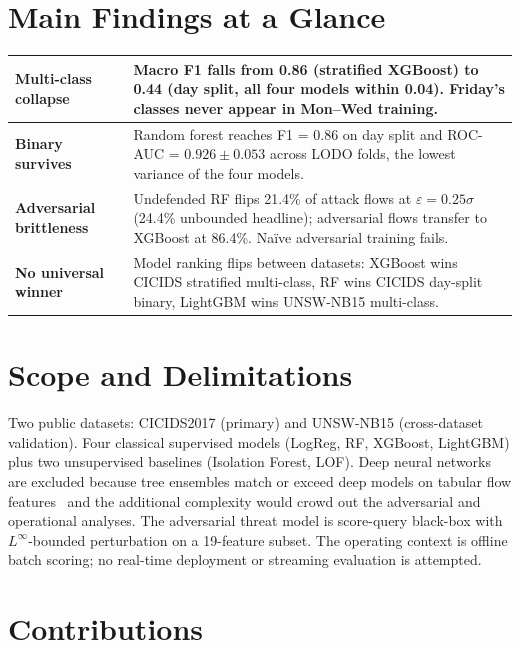 \section{Main Findings at a Glance}
\label{sec:findings-dashboard}

\begin{table}[H]
    \centering
    \footnotesize
    \renewcommand{\arraystretch}{1.4}
    \begin{tabular}{|p{3.5cm}|p{10.5cm}|}
        \hline
        \textbf{Multi-class collapse} & Macro F1 falls from 0.86 (stratified XGBoost) to 0.44 (day split, all four models within 0.04). Friday's classes never appear in Mon--Wed training. \\
        \hline
        \textbf{Binary survives} & Random forest reaches F1 = 0.86 on day split and ROC-AUC = $0.926 \pm 0.053$ across LODO folds, the lowest variance of the four models. \\
        \hline
        \textbf{Adversarial brittleness} & Undefended RF flips 21.4\% of attack flows at $\varepsilon = 0.25\sigma$ (24.4\% unbounded headline); adversarial flows transfer to XGBoost at 86.4\%. Naïve adversarial training fails. \\
        \hline
        \textbf{No universal winner} & Model ranking flips between datasets: XGBoost wins CICIDS stratified multi-class, RF wins CICIDS day-split binary, LightGBM wins UNSW-NB15 multi-class. \\
        \hline
    \end{tabular}
\end{table}

\section{Scope and Delimitations}

Two public datasets: CICIDS2017 (primary) and UNSW-NB15 (cross-dataset
validation). Four classical supervised models (LogReg, RF, XGBoost,
LightGBM) plus two unsupervised baselines (Isolation Forest, LOF). Deep
neural networks are excluded because tree ensembles match or exceed deep
models on tabular flow features~\cite{Grinsztajn2022} and the additional
complexity would crowd out the adversarial and operational analyses. The
adversarial threat model is score-query black-box with
$L^\infty$-bounded perturbation on a 19-feature subset. The operating
context is offline batch scoring; no real-time deployment or streaming
evaluation is attempted.

\section{Contributions}

